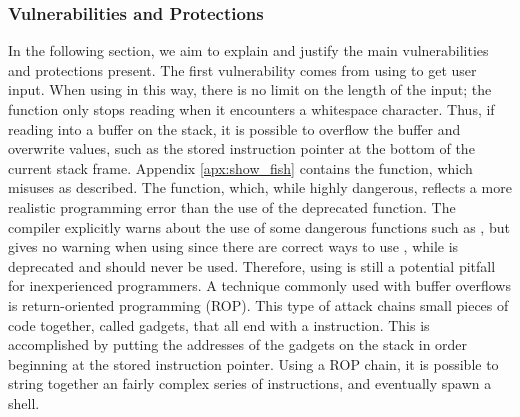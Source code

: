\subsubsection{Vulnerabilities and Protections}
In the following section, we aim to explain and justify the main vulnerabilities and protections present. 
The first vulnerability comes from using  to get user input. When using  in this way, there is no limit on the length of the input; the function only stops reading when it encounters a whitespace character. Thus, if reading into a buffer on the stack, it is possible to overflow the buffer and overwrite values, such as the stored instruction pointer at the bottom of the current stack frame. Appendix \ref{apx:show_fish} contains the  function, which misuses  as described. The  function, which, while highly dangerous, reflects a more realistic programming error than the use of the deprecated  function. The compiler explicitly warns about the use of some dangerous functions such as , but gives no warning when using  since there are correct ways to use , while  is deprecated and should never be used. Therefore, using  is still a potential pitfall for inexperienced programmers. 
A technique commonly used with buffer overflows is return-oriented programming (ROP)\cite{rop}. This type of attack chains small pieces of code together, called gadgets, that all end with a  instruction. This is accomplished by putting the addresses of the gadgets on the stack in order beginning at the stored instruction pointer. Using a ROP chain, it is possible to string together an fairly complex series of instructions, and eventually spawn a shell.



